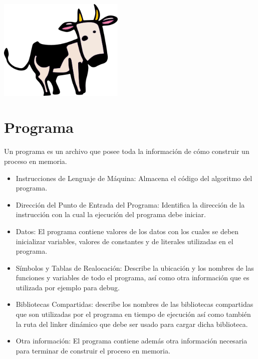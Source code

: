 \documentclass{article}
\begin{document}
\begin{titlepage}
  \begin{center}
    \includegraphics[width=6cm]{media/Larry.png}
  \end{center}

\end{titlepage}

\tableofcontents


\section{Programa}\label{programa}

Un programa es un archivo que posee toda la información de cómo
construir un proceso en memoria.

\begin{itemize}
\item
  Instrucciones de Lenguaje de Máquina: Almacena el código del algoritmo
  del programa.
\item
  Dirección del Punto de Entrada del Programa: Identifica la dirección
  de la instrucción con la cual la ejecución del programa debe iniciar.
\item
  Datos: El programa contiene valores de los datos con los cuales se
  deben inicializar variables, valores de constantes y de literales
  utilizadas en el programa.
\item
  Símbolos y Tablas de Realocación: Describe la ubicación y los nombres
  de las funciones y variables de todo el programa, así como otra
  información que es utilizada por ejemplo para debug.
\item
  Bibliotecas Compartidas: describe los nombres de las bibliotecas
  compartidas que son utilizadas por el programa en tiempo de ejecución
  así como también la ruta del linker dinámico que debe ser usado para
  cargar dicha biblioteca.
\item
  Otra información: El programa contiene además otra información
  necesaria para terminar de construir el proceso en memoria.
\end{itemize}
\end{document}
